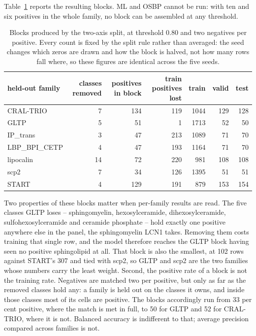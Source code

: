 Table~\ref{tab:doublesplit} reports the resulting blocks. ML and OSBP cannot be run: with ten and
six positives in the whole family, no block can be assembled at any threshold.

\begin{table}[htbp]
\centering
\begin{tabular}{lrrrrrr}
\hline
held-out family & classes removed & positives in block & train positives lost & train & valid & test \\
\hline
CRAL-TRIO & 7 & 134 & 119 & 1044 & 129 & 128 \\
GLTP & 5 & 51 & 1 & 1713 & 52 & 50 \\
IP\_trans & 3 & 47 & 213 & 1089 & 71 & 70 \\
LBP\_BPI\_CETP & 4 & 47 & 193 & 1164 & 71 & 70 \\
lipocalin & 14 & 72 & 220 & 981 & 108 & 108 \\
scp2 & 7 & 34 & 126 & 1395 & 51 & 51 \\
START & 4 & 129 & 191 & 879 & 153 & 154 \\
\hline
\end{tabular}
\caption{Blocks produced by the two-axis split, at threshold 0.80 and two negatives per positive.
Every count is fixed by the split rule rather than averaged: the seed changes which zeros are drawn
and how the block is halved, not how many rows fall where, so these figures are identical across the
five seeds.}
\label{tab:doublesplit}
\end{table}

Two properties of these blocks matter when per-family results are read. The five classes GLTP
loses -- sphingomyelin, hexosylceramide, dihexosylceramide, sulfohexosylceramide and ceramide
phosphate -- hold exactly one positive anywhere else in the panel, the sphingomyelin LCN1 takes.
Removing them costs training that single row, and the model therefore reaches the GLTP block
having seen no positive sphingolipid at all. That block is also the smallest, at 102 rows against
START's 307 and tied with scp2, so GLTP and scp2 are the two families whose numbers carry the
least weight. Second, the positive rate of a block is not the training rate. Negatives are matched
two per positive, but only as far as the removed classes hold any: a family is held out on the
classes it owns, and inside those classes most of its cells are positive. The blocks accordingly
run from 33 per cent positive, where the match is met in full, to 50 for GLTP and 52 for
CRAL-TRIO, where it is not. Balanced accuracy is indifferent to that; average precision compared
across families is not.

